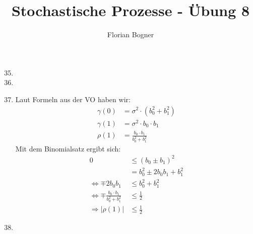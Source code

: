 \documentclass[a4paper,11pt,notitlepage,fullpage]{article}
\begin{document}
\author{Florian Bogner}
\title{Stochastische Prozesse - Übung 8}
\maketitle

\begin{enumerate}
\setcounter{enumi}{34}

\item 

\item

\item Laut Formeln aus der VO haben wir:
\begin{align*}
\gamma(0) &= \sigma^2 \cdot (b_0^2 + b_1^2) \\
\gamma(1) &= \sigma^2 \cdot b_0 \cdot b_1 \\
\rho(1) &= \frac{b_0 \cdot b_1}{b_0^2 + b_1^2}
\end{align*}
Mit dem Binomialsatz ergibt sich:
\begin{align*}
0 &\leq (b_0 \pm b_1)^2 \\
&= b_0^2 \pm 2b_0b_1 + b_1^2 \\
\Leftrightarrow \mp 2b_0b_1 &\leq b_0^2 + b_1^2 \\
\Leftrightarrow \mp \frac{b_0 \cdot b_1}{b_0^2 + b_1^2} &\leq \frac{1}{2} \\
\Rightarrow |\rho(1)| &\leq \frac{1}{2}
\end{align*}




\item

\end{enumerate}
\end{document}
